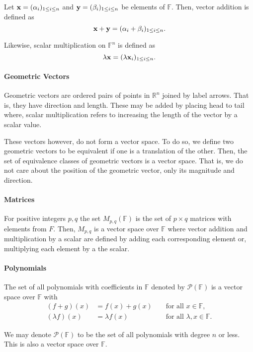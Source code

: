 Let \(\mathbf{x} = (\alpha_i)_{1\leq i \leq n}\)
and \(\mathbf{y} = (\beta_i)_{1\leq i \leq n}\) be elements of \(\mathbb{F}\).
Then, vector addition is defined as
\[
        \mathbf{x} + \mathbf{y} = (\alpha_i + \beta_i)_{1\leq i \leq n}.
\]

Likewise, scalar multiplication on \(\mathbb{F}^n\) is defined as
\[
    \lambda\mathbf{x} = (\lambda \mathbf{x}_i)_{1 \leq i \leq n}.
\]

\paragraph{Geometric Vectors}
Geometric vectors are ordered pairs of points in \(\mathbb{R}^n\)
joined by label arrows. That is, they have direction and length.
These may be added by placing head to tail where, scalar multiplication
refers to increasing the length of the vector by a scalar value.

These vectors however, do not form a vector space. To do so, we define two
geometric vectors to be equivalent if one is a translation of the other.
Then, the set of equivalence classes of geometric vectors is a vector space.
That is, we do not care about the position of the geometric vector,
only its magnitude and direction.

\paragraph{Matrices}
For positive integers \(p, q\) the set \(M_{p, q}(\mathbb{F})\)
is the set of \(p\times q\) matrices with elements from \(F\).
Then, \(M_{p, q}\) is a vector space over \(\mathbb{F}\)
where vector addition and multiplication by a scalar are defined
by adding each corresponding element or, multiplying each element
by a the scalar.

\paragraph{Polynomials}
The set of all polynomials with coefficients in \(\mathbb{F}\)
denoted by \(\mathcal{P}(\mathbb{F})\) is a vector space over
\(\mathbb{F}\) with
\begin{align}
    (f+g)(x) &= f(x) + g(x) && \text{ for all } x\in \mathbb{F}, \\
    (\lambda f)(x) &= \lambda f(x) && \text{ for all } \lambda, x\in \mathbb{F}.
\end{align}

We may denote \(\mathcal{P}(\mathbb{F})\) to be the set of all polynomials
with degree \(n\) or less. This is also a vector space over \(\mathbb{F}\).

